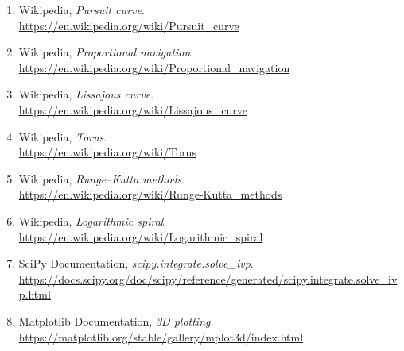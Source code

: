 \documentclass[12pt,a4paper]{article}
\begin{document}
\begin{enumerate}
    \item Wikipedia, \textit{Pursuit curve}. \\
    \url{https://en.wikipedia.org/wiki/Pursuit_curve}

    \item Wikipedia, \textit{Proportional navigation}. \\
    \url{https://en.wikipedia.org/wiki/Proportional_navigation}

    \item Wikipedia, \textit{Lissajous curve}. \\
    \url{https://en.wikipedia.org/wiki/Lissajous_curve}

    \item Wikipedia, \textit{Torus}. \\
    \url{https://en.wikipedia.org/wiki/Torus}

    \item Wikipedia, \textit{Runge–Kutta methods}. \\
    \url{https://en.wikipedia.org/wiki/Runge-Kutta_methods}

    \item Wikipedia, \textit{Logarithmic spiral}. \\
    \url{https://en.wikipedia.org/wiki/Logarithmic_spiral}

    \item SciPy Documentation, \textit{scipy.integrate.solve\_ivp}. \\
    \url{https://docs.scipy.org/doc/scipy/reference/generated/scipy.integrate.solve_ivp.html}

    \item Matplotlib Documentation, \textit{3D plotting}. \\
    \url{https://matplotlib.org/stable/gallery/mplot3d/index.html}
\end{enumerate}
\end{document}
